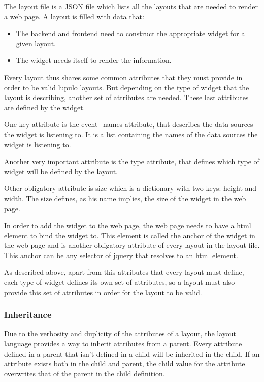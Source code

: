 \documentclass[12pt]{article}
\begin{document}
            The layout file is a JSON file which lists all the layouts that
            are needed to render a web page. A layout is filled with data that:
            \begin{itemize}
                \item The backend and frontend need to construct the appropriate
                      widget for a given layout.
                \item The widget needs itself to render the information.
            \end{itemize}

            Every layout thus shares some common attributes that they must
            provide in order to be valid lupulo layouts. But depending on the
            type of widget that the layout is describing, another set of
            attributes are needed. These last attributes are defined by the
            widget.

            One key attribute is the event\_names attribute, that describes the
            data sources the widget is listening to. It is a list containing the
            names of the data sources the widget is listening to.

            Another very important attribute is the type attribute, that defines
            which type of widget will be defined by the layout.

            Other obligatory attribute is size which is a dictionary with two
            keys: height and width. The size defines, as his name implies,
            the size of the widget in the web page.

            In order to add the widget to the web page, the web page needs to
            have a html element to bind the widget to. This element is called
            the anchor of the widget in the web page and is another obligatory
            attribute of every layout in the layout file. This anchor can be any
            selector of jquery that resolves to an html element.

            As described above, apart from this attributes that every layout
            must define, each type of widget defines its own set of attributes,
            so a layout must also provide this set of attributes in order for
            the layout to be valid.

            \subsubsection{Inheritance}
                Due to the verbosity and duplicity of the attributes of a
                layout, the layout language provides a way to inherit attributes
                from a parent. Every attribute defined in a parent that isn't
                defined in a child will be inherited in the child. If an
                attribute exists both in the child and parent, the child value
                for the attribute overwrites that of the parent in the child
                definition.
\end{document}
